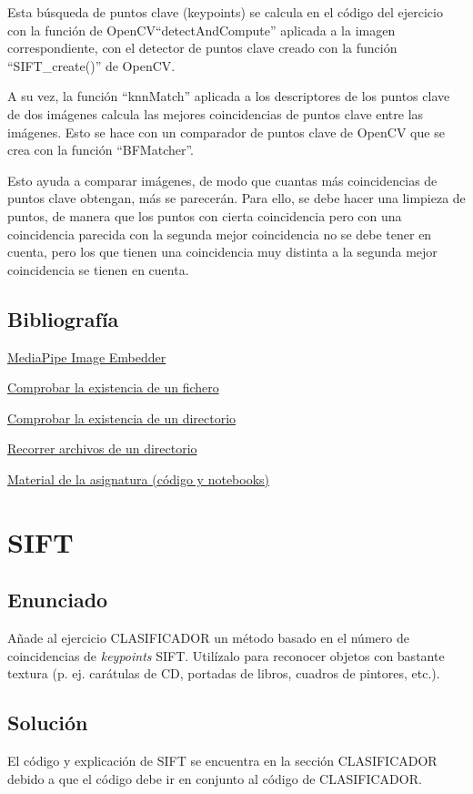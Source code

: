 \documentclass[12pt]{article}
\begin{document}
Esta búsqueda de puntos clave (keypoints) se calcula en el código del ejercicio con la función de OpenCV``detectAndCompute'' aplicada a la imagen correspondiente, con el detector de puntos clave creado con la función ``SIFT\_create()'' de OpenCV.

A su vez, la función ``knnMatch'' aplicada a los descriptores de los puntos clave de dos imágenes calcula las mejores coincidencias de puntos clave entre las imágenes. Esto se hace con un comparador de puntos clave de OpenCV que se crea con la función ``BFMatcher''.

Esto ayuda a comparar imágenes, de modo que cuantas más coincidencias de puntos clave obtengan, más se parecerán. Para ello, se debe hacer una limpieza de puntos, de manera que los puntos con cierta coincidencia pero con una coincidencia parecida con la segunda mejor coincidencia no se debe tener en cuenta, pero los que tienen una coincidencia muy distinta a la segunda mejor coincidencia se tienen en cuenta.

\subsection*{Bibliografía}
\href{https://developers.google.com/mediapipe/solutions/vision/image_embedder/python}{MediaPipe Image Embedder}

\href{https://www.geeksforgeeks.org/python-os-path-exists-method/}{Comprobar la existencia de un fichero}

\href{https://www.geeksforgeeks.org/python-os-path-isdir-method/}{Comprobar la existencia de un directorio}

\href{https://www.codigopiton.com/como-listar-archivos-de-carpeta-en-python/}{Recorrer archivos de un directorio}

\href{https://github.com/albertoruiz/umucv/blob/master}{Material de la asignatura (código y notebooks)}
\newpage
\section{SIFT}
\subsection*{Enunciado}
Añade al ejercicio CLASIFICADOR un método basado en el número de coincidencias de \textit{keypoints} SIFT. Utilízalo para reconocer objetos con bastante textura (p. ej. carátulas de CD, portadas de libros, cuadros de pintores, etc.).

\subsection*{Solución}
El código y explicación de SIFT se encuentra en la sección CLASIFICADOR debido a que el código debe ir en conjunto al código de CLASIFICADOR.
\newpage
\end{document}

